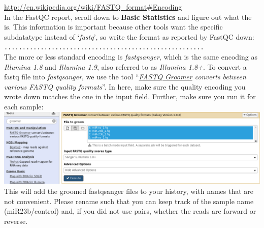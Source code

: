 \url{http://en.wikipedia.org/wiki/FASTQ\_format#Encoding}\\
In the FastQC report, scroll down to \textbf{Basic Statistics} and figure out what the  is. This information is important because other tools want the specific subdatatype instead of `\textit{fastq}', so write the format as reported by FastQC down:\\
\verb|.......................................................|\\
The more or less standard encoding is \textit{fastqsanger}, which is the same encoding as \textit{Illumina 1.8} and \textit{Illumina 1.9}, also referred to as \textit{Illumina 1.8+}. To convert a fastq file into \textit{fastqsanger}, we use the tool ``\textit{\underline{FASTQ Groomer} converts between various FASTQ quality formats}''. In here, make sure the quality encoding you wrote down matches the one in the input field. Further, make sure you run it for each sample:\\
\includegraphics[width=\textwidth]{figures/qc_05.png}\\
This will add the groomed fastqsanger files to your history, with names that are not convenient. Please rename such that you can keep track of the sample name (miR23b/control) and, if you did not use pairs, whether the reads are forward or reverse.

